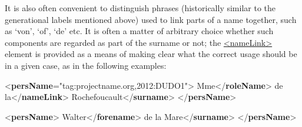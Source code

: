 It is also often convenient to distinguish phrases (historically similar to the generational labels mentioned above) used to link parts of a name together, such as ‘von’, ‘of’, ‘de’ etc. It is often a matter of arbitrary choice whether such components are regarded as part of the surname or not; the \hyperref[TEI.nameLink]{<nameLink>} element is provided as a means of making clear what the correct usage should be in a given case, as in the following examples: \par\bgroup{}\exampleFont \begin{shaded}\noindent\mbox{}{<\textbf{persName}\hspace*{1em}{ref}="{tag:projectname.org,2012:DUDO1}">}\mbox{}\newline 
{}Mme{</\textbf{roleName}>}\mbox{}\newline 
{}de la{</\textbf{nameLink}>}\mbox{}\newline 
{}Rochefoucault{</\textbf{surname}>}\mbox{}\newline 
{</\textbf{persName}>}\end{shaded}\egroup\par \noindent  \par\bgroup{}\exampleFont \begin{shaded}\noindent\mbox{}{<\textbf{persName}>}\mbox{}\newline 
{}Walter{</\textbf{forename}>}\mbox{}\newline 
{}de la Mare{</\textbf{surname}>}\mbox{}\newline 
{</\textbf{persName}>}\end{shaded}\egroup\par \par

